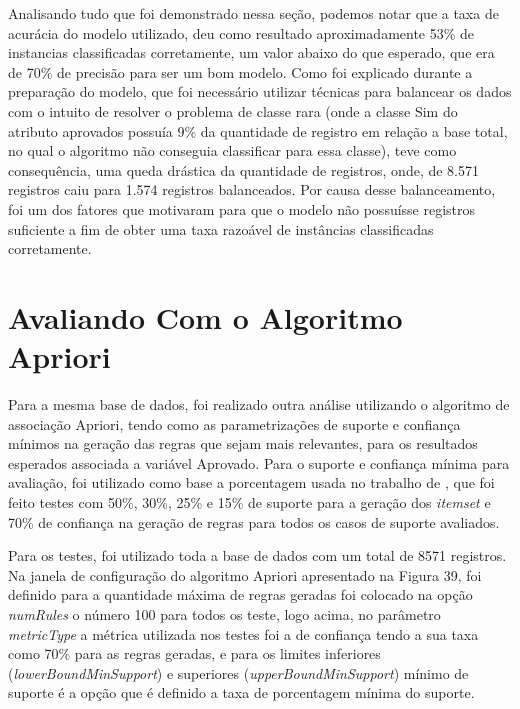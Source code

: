 \par
Analisando tudo que foi demonstrado nessa seção, podemos notar que a taxa de acurácia do modelo utilizado, deu como resultado aproximadamente 53\% de instancias classificadas corretamente, um valor abaixo do que esperado, que era de 70\% de precisão para ser um bom modelo. Como foi explicado durante a preparação do modelo, que foi necessário utilizar técnicas para balancear os dados com o intuito de resolver o problema de classe rara (onde a classe Sim do atributo aprovados possuía 9\% da quantidade de registro em relação a base total, no qual o algoritmo não conseguia classificar para essa classe), teve como consequência, uma queda drástica da quantidade de registros, onde, de 8.571 registros caiu para 1.574 registros balanceados. Por causa desse balanceamento, foi um dos fatores que motivaram para que o modelo não possuísse registros suficiente a fim de obter uma taxa razoável de instâncias classificadas corretamente.



\section{Avaliando Com o Algoritmo Apriori}


Para a mesma base de dados, foi realizado outra análise utilizando o algoritmo de associação Apriori, tendo como as parametrizações de suporte e confiança mínimos na geração das regras que sejam mais relevantes, para os resultados esperados associada a variável Aprovado. Para o suporte e confiança mínima para avaliação, foi utilizado como base a porcentagem usada no trabalho de , que foi feito testes com 50\%, 30\%, 25\% e 15\% de suporte para a geração dos \textit{itemset} e 70\% de confiança na geração de regras para todos os casos de suporte avaliados.

\par
Para os testes, foi utilizado toda a base de dados com um total de 8571 registros. Na janela de configuração do algoritmo Apriori apresentado na Figura 39, foi definido para a quantidade máxima de regras geradas foi colocado na opção \textit{numRules} o número 100 para todos os teste, logo acima, no parâmetro \textit{metricType} a métrica utilizada nos testes foi a de confiança tendo a sua taxa como 70\% para as regras geradas, e para os limites inferiores (\textit{lowerBoundMinSupport}) e superiores (\textit{upperBoundMinSupport}) mínimo de suporte é a opção que é definido a taxa de porcentagem mínima do suporte.


